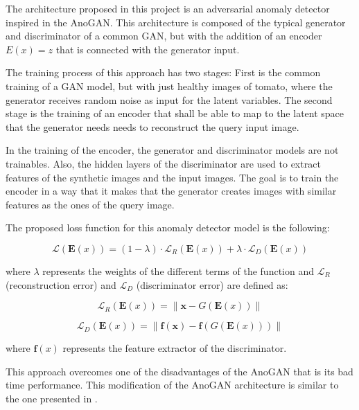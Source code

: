 The architecture proposed in this project is an adversarial anomaly detector inspired in the AnoGAN. This architecture is composed of the typical generator and discriminator of a common GAN, but with the addition of an encoder \begin{math}E(x) = z\end{math} that is connected with the generator input.

The training process of this approach has two stages: First is the common training of a GAN model, but with just healthy images of tomato, where the generator receives random noise as input for the latent variables. The second stage is the training of an encoder that shall be able to map to the latent space that the generator needs needs to reconstruct the query input image.

In the training of the encoder, the generator and discriminator models are not trainables. Also, the hidden layers of the discriminator are used to extract features of the synthetic images and the input images. The goal is to train the encoder in a way that it makes that the generator creates images with similar features as the ones of the query image.

The proposed loss function for this anomaly detector model is the following:

\begin{equation}
 \mathcal{L}\left(\mathbf{E}(x)\right)=(1-\lambda) \cdot \mathcal{L}_{R}\left(\mathbf{E}(x)\right)+\lambda \cdot \mathcal{L}_{D}\left(\mathbf{E}(x)\right)
\end{equation}

where \begin{math}\lambda\end{math} represents the weights of the different terms of the function and \begin{math}\mathcal{L}_{R}\end{math} (reconstruction error) and \begin{math}\mathcal{L}_{D}\end{math} (discriminator error) are defined as:

\begin{equation}
 \mathcal{L}_{R}\left(\mathbf{E}(x)\right)=\left\|\mathbf{x}-G\left(\mathbf{E}(x)\right)\right\|
\end{equation}

\begin{equation}
 \mathcal{L}_{D}\left(\mathbf{E}(x)\right)=\left\|\mathbf{f}(\mathbf{x})-\mathbf{f}\left(G\left(\mathbf{E}(x)\right)\right)\right\|
\end{equation}

where \begin{math}\mathbf{f}(x)\end{math} represents the feature extractor of the discriminator.

This approach overcomes one of the disadvantages of the AnoGAN that is its bad time performance. This modification of the AnoGAN architecture is similar to the one presented in \cite{Schlegl2019}.
